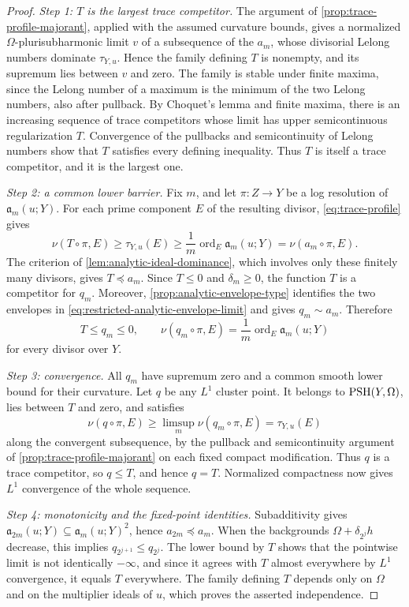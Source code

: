 \begin{proof}
\emph{Step 1: $T$ is the largest trace competitor.} The argument of \cref{prop:trace-profile-majorant}, applied with the assumed curvature bounds, gives a normalized $\Omega$-plurisubharmonic limit $v$ of a subsequence of the $a_m$, whose divisorial Lelong numbers dominate $\tau_{Y,u}$. Hence the family defining $T$ is nonempty, and its supremum lies between $v$ and zero. The family is stable under finite maxima, since the Lelong number of a maximum is the minimum of the two Lelong numbers, also after pullback. By Choquet's lemma and finite maxima, there is an increasing sequence of trace competitors whose limit has upper semicontinuous regularization $T$. Convergence of the pullbacks and semicontinuity of Lelong numbers show that $T$ satisfies every defining inequality. Thus $T$ is itself a trace competitor, and it is the largest one.

\emph{Step 2: a common lower barrier.} Fix $m$, and let $\pi\colon Z\to Y$ be a log resolution of $\mathfrak a_m(u;Y)$. For each prime component $E$ of the resulting divisor, \eqref{eq:trace-profile} gives
\[
 \nu(T\circ\pi,E)\geq\tau_{Y,u}(E)
       \geq\frac1m\operatorname{ord}_E\mathfrak a_m(u;Y)
       =\nu(a_m\circ\pi,E).
\]
The criterion of \cref{lem:analytic-ideal-dominance}, which involves only these finitely many divisors, gives $T\preceq a_m$. Since $T\leq0$ and $\delta_m\geq0$, the function $T$ is a competitor for $q_m$. Moreover, \cref{prop:analytic-envelope-type} identifies the two envelopes in \eqref{eq:restricted-analytic-envelope-limit} and gives $q_m\sim a_m$. Therefore
\[
 T\leq q_m\leq0,\qquad
 \nu(q_m\circ\pi,E)=\frac1m\operatorname{ord}_E\mathfrak a_m(u;Y)
\]
for every divisor over $Y$.

\emph{Step 3: convergence.} All $q_m$ have supremum zero and a common smooth lower bound for their curvature. Let $q$ be any $L^1$ cluster point. It belongs to $\mathrm{PSH}(Y,\Omega)$, lies between $T$ and zero, and satisfies
\[
 \nu(q\circ\pi,E)\geq\limsup_m\nu(q_m\circ\pi,E)
       =\tau_{Y,u}(E)
\]
along the convergent subsequence, by the pullback and semicontinuity argument of \cref{prop:trace-profile-majorant} on each fixed compact modification. Thus $q$ is a trace competitor, so $q\leq T$, and hence $q=T$. Normalized compactness now gives $L^1$ convergence of the whole sequence.

\emph{Step 4: monotonicity and the fixed-point identities.} Subadditivity gives $\mathfrak a_{2m}(u;Y)\subseteq\mathfrak a_m(u;Y)^2$, hence $a_{2m}\preceq a_m$. When the backgrounds $\Omega+\delta_{2^j}h$ decrease, this implies $q_{2^{j+1}}\leq q_{2^j}$. The lower bound by $T$ shows that the pointwise limit is not identically $-\infty$, and since it agrees with $T$ almost everywhere by $L^1$ convergence, it equals $T$ everywhere. The family defining $T$ depends only on $\Omega$ and on the multiplier ideals of $u$, which proves the asserted independence.


\end{proof}
